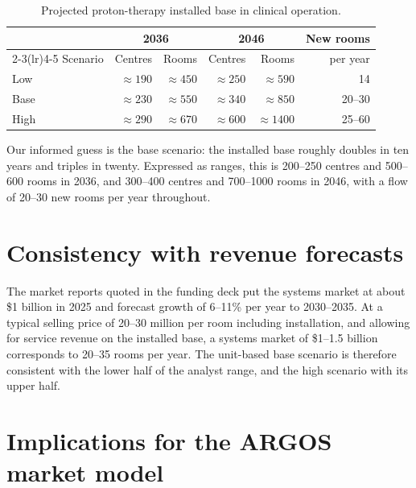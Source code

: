 \documentclass[11pt,a4paper]{article}
\begin{document}
\begin{table}[h]
\centering
\caption{Projected proton-therapy installed base in clinical operation.}
\label{tab:scenarios}
\begin{tabular}{@{}lrrrrr@{}}
\toprule
 & \multicolumn{2}{c}{2036} & \multicolumn{2}{c}{2046} & New rooms \\
\cmidrule(lr){2-3}\cmidrule(lr){4-5}
Scenario & Centres & Rooms & Centres & Rooms & per year \\
\midrule
Low  & $\approx 190$ & $\approx 450$  & $\approx 250$ & $\approx 590$  & 14 \\
Base & $\approx 230$ & $\approx 550$  & $\approx 340$ & $\approx 850$  & 20--30 \\
High & $\approx 290$ & $\approx 670$  & $\approx 600$ & $\approx 1400$ & 25--60 \\
\bottomrule
\end{tabular}
\end{table}

Our informed guess is the base scenario: the installed base roughly doubles in
ten years and triples in twenty. Expressed as ranges, this is 200--250 centres
and 500--600 rooms in 2036, and 300--400 centres and 700--1000 rooms in 2046,
with a flow of 20--30 new rooms per year throughout.

\section{Consistency with revenue forecasts}

The market reports quoted in the funding deck put the systems market at about
\$1 billion in 2025 and forecast growth of 6--11\% per year to 2030--2035. At a
typical selling price of \EUR{}20--30 million per room including installation,
and allowing for service revenue on the installed base, a systems market of
\$1--1.5 billion corresponds to 20--35 rooms per year. The unit-based base
scenario is therefore consistent with the lower half of the analyst range, and
the high scenario with its upper half.

\section{Implications for the ARGOS market model}
\end{document}
